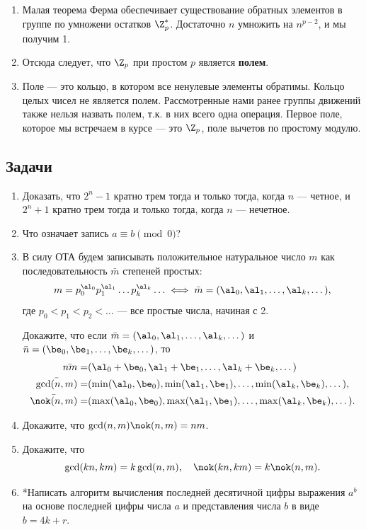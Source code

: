 \begin{enumerate}
\item Малая теорема Ферма обеспечивает существование обратных элементов в группе по умножени остатков $\Z_p^*$. Достаточно $n$ умножить на $n^{p-2}$, и мы получим 1.
\item Отсюда следует, что $\Z_p$ при простом $p$ является \textbf{полем}.
\item Поле --- это кольцо, в котором все ненулевые элементы обратимы. Кольцо целых чисел не является полем. Рассмотренные нами ранее группы движений также нельзя назвать полем, т.к. в них всего одна операция. Первое поле, которое мы встречаем в курсе --- это $\Z_p$, поле вычетов по простому модулю.
\end{enumerate}
\subsection*{Задачи}

\begin{enumerate}
\item Доказать, что $2^n-1$ кратно трем тогда и только тогда, когда $n$ --- четное, и $2^n+1$ кратно трем тогда и только тогда, когда $n$ --- нечетное.
\item Что означает запись $a\equiv b\pmod 0$?
\item В силу ОТА будем записывать положительное натуральное число $m$ как последовательность $\bar m$ степеней простых:
$$
m=p_0^{\al_0}p_1^{\al_1}\dots p_k^{\al_k}\ldots\iff \bar m=(\al_0,\al_1,\dots,\al_k,\dots),
$$
где $p_0<p_1<p_2<\dots$ --- все простые числа, начиная с 2.

Докажите, что если $\bar m=(\al_0,\al_1,\dots,\al_k,\dots)$ и $\bar n=(\be_0,\be_1,\dots,\be_k,\dots)$, то
\begin{align*}
\bar{nm} = & (\al_0+\be_0,\al_1+\be_1,\dots,\al_k+\be_k,\dots) \\
\bar{\gcd(n,m)} = & (\min(\al_0,\be_0),\min(\al_1,\be_1),\dots,\min(\al_k,\be_k),\dots), \\
\bar{\nok(n,m)} = & (\max(\al_0,\be_0),\max(\al_1,\be_1),\dots,\max(\al_k,\be_k),\dots).
\end{align*}

\item Докажите, что $\gcd(n,m)\nok(n,m)=nm$.
\item Докажите, что
$$
\gcd(kn,km)=k\gcd(n,m),\quad \nok(kn,km)=k\nok(n,m).
$$
\item *Написать алгоритм вычисления последней десятичной цифры выражения $a^b$ на основе последней цифры числа $a$ и представления числа $b$ в виде $b=4k+r$.
\end{enumerate}



